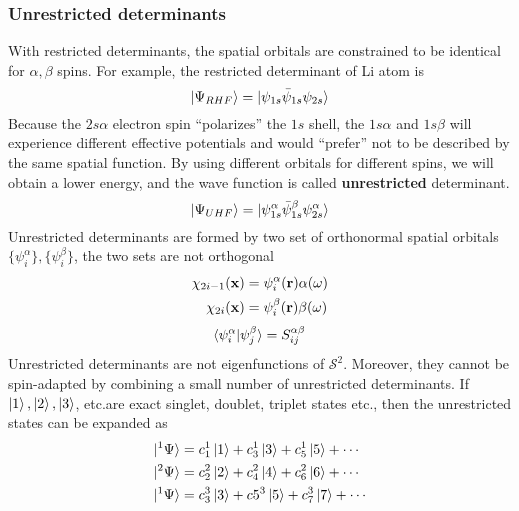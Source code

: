 \documentclass[11pt]{article}
\begin{document}
\subsubsection{Unrestricted determinants}
With restricted determinants, the spatial orbitals are constrained to be identical for $\alpha, \beta$ spins. For example,
the restricted determinant of Li atom is
\begin{equation}
    \ket{\Psi_{RHF}}=\ket{\psi_{1s}\bar{\psi}_{1s}\psi_{2s}}
\end{equation}
Because the $2s\alpha$ electron spin ``polarizes'' the $1s$ shell, the $1s\alpha$ and $1s\beta$ will experience different effective potentials and would ``prefer'' not 
to be described by the same spatial function. By using different orbitals for different spins, we will obtain a lower energy, and the wave function is called \textbf{unrestricted}
determinant.
\begin{equation}
    \ket{\Psi_{UHF}}=\ket{\psi_{1s}^{\alpha}\bar{\psi}_{1s}^{\beta}\psi_{2s}^{\alpha}}
\end{equation}
Unrestricted determinants are formed by two set of orthonormal spatial orbitals $\{\psi_i^{\alpha}\}, \{\psi_i^{\beta}\}$, the two sets are not orthogonal
\begin{equation}
    \begin{split}
        \chi_{2i-1}(\mathbf{x})&=\psi_i^{\alpha}(\mathbf{r})\alpha(\omega) \notag\\\
        \chi_{2i}(\mathbf{x})&=\psi_i^{\beta}(\mathbf{r})\beta(\omega)\\
    \end{split}
\end{equation}
\begin{equation}
    \braket{\psi_i^{\alpha}|\psi_j^{\beta}}=S_{ij}^{\alpha\beta}
\end{equation}
Unrestricted determinants are not eigenfunctions of $\mathcal{S}^2$. Moreover, they cannot be spin-adapted by combining a small number of unrestricted determinants.
If $\ket{1},\ket{2},\ket{3}$, etc.are exact singlet, doublet, triplet states etc., then the unrestricted states can be expanded as
\begin{equation}
    \begin{split}
        \ket{ ^1\Psi}&=c_1^1\ket{1}+c_3^1\ket{3}+c_5^1\ket{5}+\cdots\\
        \ket{ ^2\Psi}&=c_2^2\ket{2}+c_4^2\ket{4}+c_6^2\ket{6}+\cdots\\
        \ket{ ^1\Psi}&=c_3^3\ket{3}+c5^3\ket{5}+c_7^3\ket{7}+\cdots
    \end{split}
\end{equation} 
\end{document}
